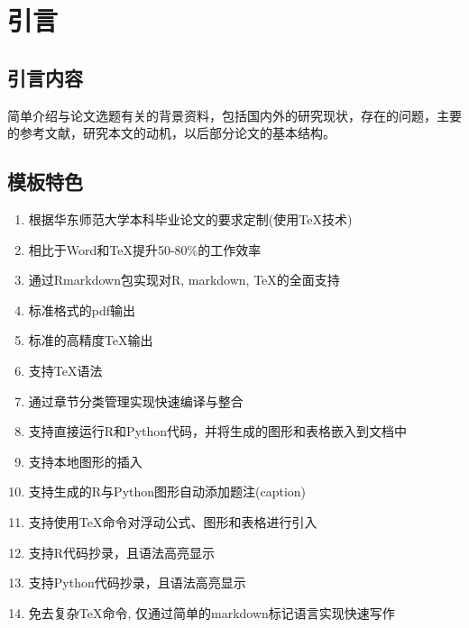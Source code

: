 \chapter{引言}\label{chap1}

\section{引言内容}

简单介绍与论文选题有关的背景资料，包括国内外的研究现状，存在的问题，主要的参考文献，研究本文的动机，以后部分论文的基本结构。

\section{模板特色}

\begin{enumerate}
	\def\labelenumi{\arabic{enumi}.}
	\item
	根据华东师范大学本科毕业论文的要求定制(使用\TeX{}技术)
	\item
	相比于Word和TeX提升50-80\%的工作效率
	\item
	通过Rmarkdown包实现对R, markdown, \TeX{}的全面支持
	\item
	标准格式的pdf输出
	\item
	标准的高精度\TeX{}输出
	\item
	支持\TeX{}语法
	\item
	通过章节分类管理实现快速编译与整合
	\item
	支持直接运行R和Python代码，并将生成的图形和表格嵌入到文档中
	\item
	支持本地图形的插入
	\item
	支持生成的R与Python图形自动添加题注(caption)
	\item
	支持使用\TeX{}命令对浮动公式、图形和表格进行引入
	\item
	支持R代码抄录，且语法高亮显示
	\item
	支持Python代码抄录，且语法高亮显示
	\item
	免去复杂\TeX{}命令, 仅通过简单的markdown标记语言实现快速写作
\end{enumerate}



